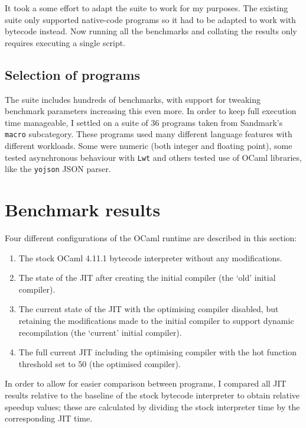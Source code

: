 It took a some effort to adapt the suite to work for my purposes. The existing suite only
supported native-code programs so it had to be adapted to work with bytecode instead. Now running
all the benchmarks and collating the results only requires executing a single script.

\subsection{Selection of programs}

The suite includes hundreds of benchmarks, with support for tweaking benchmark parameters
increasing
this even more. In order to keep full execution time manageable, I settled on a suite of 36
programs taken from Sandmark's \texttt{macro} subcategory. These programs used many different
language features with different workloads. Some were numeric (both integer and floating point),
some tested asynchronous behaviour with \texttt{Lwt} and others tested use of OCaml libraries, like
the \texttt{yojson} JSON parser.

\section{Benchmark results}

Four different configurations of the OCaml runtime are described in this section:

\begin{enumerate}
      \item The stock OCaml 4.11.1 bytecode interpreter without any modifications.
      \item The state of the JIT after creating the initial compiler (the `old' initial compiler).
      \item The current state of the JIT with the optimising compiler disabled, but retaining
            the modifications made to the initial compiler to support dynamic recompilation (the
            `current' initial compiler).
      \item The full current JIT including the optimising compiler with the hot function threshold
            set to 50 (the optimised compiler).
\end{enumerate}

In order to allow for easier comparison between programs, I compared all JIT results relative
to the baseline of the stock bytecode interpreter to obtain relative speedup values; these are
calculated by dividing the stock interpreter time by the corresponding JIT time.

